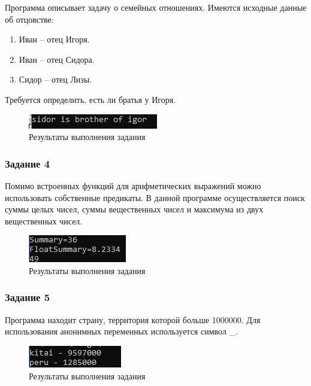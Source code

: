 \documentclass[14pt,a4paper,report]{report}
\begin{document}
Программа описывает задачу о семейных отношениях. Имеются исходные данные об отцовстве: 

\begin{enumerate}
	\item Иван – отец Игоря.
	\item Иван – отец Сидора.
	\item Сидор – отец Лизы.
\end{enumerate}

Требуется определить, есть ли братья у Игоря. 




\begin{figure}[h!]
	\centering
	\includegraphics[scale = 1.0]{images/d3.jpeg}
	\caption{Результаты выполнения задания}
\end{figure}

\subsubsection{Задание 4}

Помимо встроенных функций для арифметических выражений можно использовать собственные предикаты. В данной программе осуществляется поиск суммы целых чисел, суммы вещественных чисел и максимума из двух вещественных чисел.



\begin{figure}[h!]
	\centering
	\includegraphics[scale = 1.0]{images/d4.jpeg}
	\caption{Результаты выполнения задания}
\end{figure}

\subsubsection{Задание 5}

Программа находит страну, территория которой больше 1000000. Для использования анонимных переменных используется символ \_.



\begin{figure}[h!]
	\centering
	\includegraphics[scale = 1.0]{images/d5.jpeg}
	\caption{Результаты выполнения задания}
\end{figure}
\end{document}

